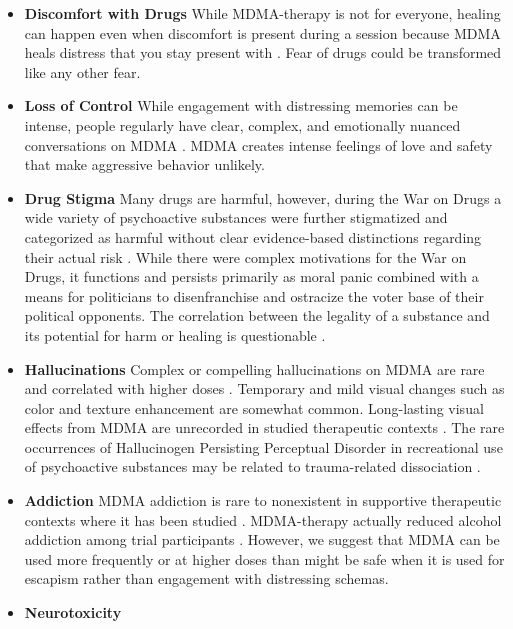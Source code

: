 \documentclass[12pt,letterpaper]{article}
\begin{document}
\begin{itemize}
    \item \textbf{Discomfort with Drugs}
     While MDMA-therapy is not for everyone, healing can happen even when discomfort is present during a session because MDMA heals distress that you stay present with \cite{fedduciaMDMAMemoryReconsolidation}. Fear of drugs could be transformed like any other fear.
    \item \textbf{Loss of Control}    
        While engagement with distressing memories can be intense, people regularly have clear, complex, and emotionally nuanced conversations on MDMA \cite{colbertEvenings,passieHistory}. MDMA creates intense feelings of love and safety that make aggressive behavior unlikely.
    \item \textbf{Drug Stigma}
        Many drugs are harmful, however, during the War on Drugs a wide variety of psychoactive substances were further stigmatized and categorized as harmful without clear evidence-based distinctions regarding their actual risk \cite{alexanderNewJimCrow,nuttDrugHarms}. While there were complex motivations for the War on Drugs, it functions and persists primarily as moral panic combined with a means for politicians to disenfranchise and ostracize the voter base of their political opponents. The correlation between the legality of a substance and its potential for harm or healing is questionable \cite{nuttDrugHarms}.
    \item \textbf{Hallucinations}
        Complex or compelling hallucinations on MDMA are rare and correlated with higher doses \cite{liechtiGender}. Temporary and mild visual changes such as color and texture enhancement are somewhat common. Long-lasting visual effects from MDMA are unrecorded in studied therapeutic contexts \cite{vizeliActuteEffects}. The rare occurrences of Hallucinogen Persisting Perceptual Disorder in recreational use of psychoactive substances may be related to trauma-related dissociation \cite{halpernHPPD}.
    \item \textbf{Addiction}
        MDMA addiction is rare to nonexistent in supportive therapeutic contexts where it has been studied \cite{mitchellMDMAClinicalTrial2,mitchellMDMAClinicalTrial}. MDMA-therapy actually reduced alcohol addiction among trial participants \cite{nicholasAlcohol}. However, we suggest that MDMA can be used more frequently or at higher doses than might be safe when it is used for escapism rather than engagement with distressing schemas.
    \item \textbf{Neurotoxicity}

\end{itemize}
\end{document}
